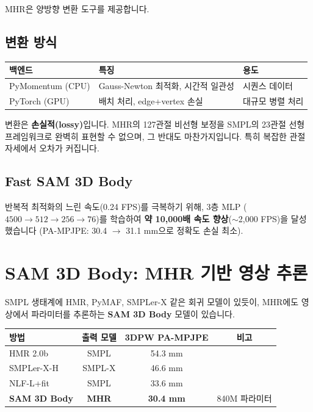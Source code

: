 \documentclass[11pt, a4paper]{report}
\begin{document}
MHR은 양방향 변환 도구를 제공합니다.

\subsection{변환 방식}

\begin{center}
\renewcommand{\arraystretch}{1.2}
\begin{tabular}{lll}
\toprule
\textbf{백엔드} & \textbf{특징} & \textbf{용도} \\
\midrule
PyMomentum (CPU) & Gauss-Newton 최적화, 시간적 일관성 & 시퀀스 데이터 \\
PyTorch (GPU) & 배치 처리, edge+vertex 손실 & 대규모 병렬 처리 \\
\bottomrule
\end{tabular}
\end{center}

\begin{warningbox}
변환은 \textbf{손실적(lossy)}입니다. MHR의 127관절 비선형 보정을 SMPL의 23관절 선형 프레임워크로 완벽히 표현할 수 없으며, 그 반대도 마찬가지입니다. 특히 복잡한 관절 자세에서 오차가 커집니다.
\end{warningbox}


\subsection{Fast SAM 3D Body}

반복적 최적화의 느린 속도(0.24 FPS)를 극복하기 위해, 3층 MLP ($4500 \to 512 \to 256 \to 76$)를 학습하여 \textbf{약 10,000배 속도 향상}($\sim$2,000 FPS)을 달성했습니다 (PA-MPJPE: 30.4 $\to$ 31.1 mm으로 정확도 손실 최소).


\section{SAM 3D Body: MHR 기반 영상 추론}

SMPL 생태계에 HMR, PyMAF, SMPLer-X 같은 회귀 모델이 있듯이, MHR에도 영상에서 파라미터를 추론하는 \textbf{SAM 3D Body} 모델이 있습니다.

\begin{center}
\renewcommand{\arraystretch}{1.2}
\begin{tabular}{lccc}
\toprule
\textbf{방법} & \textbf{출력 모델} & \textbf{3DPW PA-MPJPE} & \textbf{비고} \\
\midrule
HMR 2.0b & SMPL & 54.3 mm & \\
SMPLer-X-H & SMPL-X & 46.6 mm & \\
NLF-L+fit & SMPL & 33.6 mm & \\
\textbf{SAM 3D Body} & \textbf{MHR} & \textbf{30.4 mm} & 840M 파라미터 \\
\bottomrule
\end{tabular}
\end{center}
\end{document}
